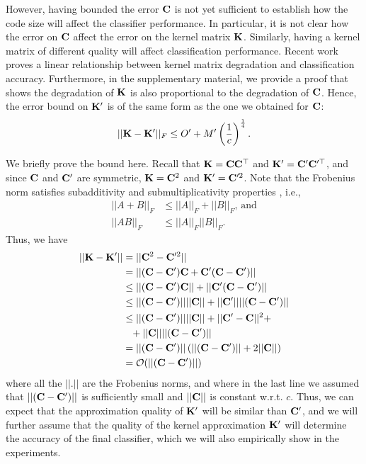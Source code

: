 However, having bounded the error $\mathbf{C}$ is not yet sufficient to establish how the code size will affect the classifier performance. In particular, it is not clear how the error on $\mathbf{C}$ affect the error on the kernel matrix $\mathbf{K}$. Similarly, having a kernel matrix of different quality will affect classification performance. Recent work \cite{cortes10} proves a linear relationship between kernel matrix degradation and classification accuracy. Furthermore, in the supplementary material, we provide a proof that shows the degradation of $\mathbf{K}$ is also proportional to the degradation of $\mathbf{C}$. Hence, the error bound on $\mathbf{K}'$ is of the same form as the one we obtained for $\mathbf{C}$:
\begin{equation}
||\mathbf{K}-\mathbf{K}'||_F \leq O' + M'\left(\frac{1}{c}\right)^{\frac{1}{4}}.
\label{eqn:bound}
\end{equation}

We briefly prove the bound here. Recall that $\mathbf{K} = \mathbf{C}\mathbf{C}^\top$ and $\mathbf{K}' = \mathbf{C}'\mathbf{C}'^\top$, and since $\mathbf{C}$ and $\mathbf{C}'$ are symmetric, $\mathbf{K} = \mathbf{C}^2$ and $\mathbf{K}' = \mathbf{C}'^2$. Note that the Frobenius norm satisfies subadditivity and submultiplicativity properties \cite{meyer01}, i.e.,
\begin{align}
    ||A+B||_F & \leq ||A||_F+||B||_F\text{, and}\\
    ||AB||_F & \leq ||A||_F||B||_F.
\end{align}
Thus, we have
\begin{align}
||\mathbf{K} - \mathbf{K}'|| & = ||\mathbf{C}^2 - \mathbf{C}'^2|| \\
& = ||(\mathbf{C}-\mathbf{C}')\mathbf{C} + \mathbf{C}'(\mathbf{C}-\mathbf{C}')|| \nonumber\\
& \leq ||(\mathbf{C}-\mathbf{C}')\mathbf{C}|| + ||\mathbf{C}'(\mathbf{C}-\mathbf{C}')||\nonumber\\
& \leq ||(\mathbf{C}-\mathbf{C}')||||\mathbf{C}|| + ||\mathbf{C}'||||(\mathbf{C}-\mathbf{C}')||\nonumber\\
& \leq ||(\mathbf{C}-\mathbf{C}')||||\mathbf{C}|| + ||\mathbf{C}'-\mathbf{C}||^2 +\nonumber\\
& \phantom{\leq} + ||\mathbf{C}||||(\mathbf{C}-\mathbf{C}')||\nonumber\\
& = ||(\mathbf{C}-\mathbf{C}')||\left(||(\mathbf{C}-\mathbf{C}')|| + 2||\mathbf{C}||\right)\nonumber\\
& = \mathcal{O}(||(\mathbf{C}-\mathbf{C}')||)\nonumber
\end{align}
where all the $||.||$ are the Frobenius norms, and where in the last line we assumed that $||(\mathbf{C}-\mathbf{C}')||$ is sufficiently small and $||\mathbf{C}||$ is constant w.r.t. $c$.  Thus, we can expect that the approximation quality of $\mathbf{K}'$ will be similar than $\mathbf{C}'$, and we will further assume that the quality of the kernel approximation $\mathbf{K}'$ will determine the accuracy of the final classifier, which we will also empirically show in the experiments.

